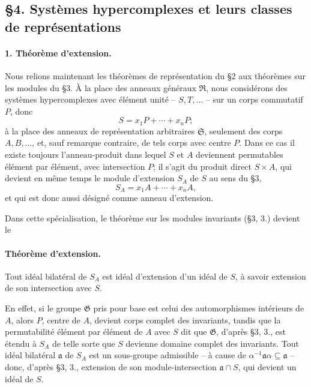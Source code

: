 \providecommand{\frR}{\mathfrak R}
\providecommand{\frS}{\mathfrak S}
\providecommand{\frG}{\mathfrak G}

\subsection*{\S 4. Systèmes hypercomplexes et leurs classes de représentations}

\paragraph{1. Théorème d'extension.}
Nous relions maintenant les théorèmes de représentation du \S 2 aux théorèmes sur les modules du \S 3. À la place des anneaux généraux \(\frR\), nous considérons des systèmes hypercomplexes avec élément unité -- \(S,T,\ldots\) -- sur un corps commutatif \(P\), donc
\[
        S=x_1P+\cdots+x_nP;
\]
à la place des anneaux de représentation arbitraires \(\frS\), seulement des corps \(A,B,\ldots\), et, sauf remarque contraire, de tels corps avec centre \(P\). Dans ce cas il existe toujours l'anneau-produit dans lequel \(S\) et \(A\) deviennent permutables élément par élément, avec intersection \(P\); il s'agit du produit direct \(S\times A\), qui devient en même temps le module d'extension \(S_A\) de \(S\) au sens du \S 3,
\[
        S_A=x_1A+\cdots+x_nA,
\]
et qui est donc aussi désigné comme anneau d'extension.

Dans cette spécialisation, le théorème sur les modules invariants (\S 3, 3.) devient le

\paragraph{Théorème d'extension.}
Tout idéal bilatéral de \(S_A\) est idéal d'extension d'un idéal de \(S\), à savoir extension de son intersection avec \(S\).

En effet, si le groupe \(\frG\) pris pour base est celui des automorphismes intérieurs de \(A\), alors \(P\), centre de \(A\), devient corps complet des invariants, tandis que la permutabilité élément par élément de \(A\) avec \(S\) dit que \(\frG\), d'après \S 3, 3., est étendu à \(S_A\) de telle sorte que \(S\) devienne domaine complet des invariants. Tout idéal bilatéral \(\mathfrak a\) de \(S_A\) est un sous-groupe admissible -- à cause de \(\alpha^{-1}\mathfrak a\alpha\subseteq\mathfrak a\) -- donc, d'après \S 3, 3., extension de son module-intersection \(\mathfrak a\cap S\), qui devient un idéal de \(S\).

